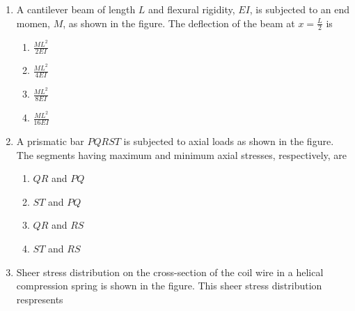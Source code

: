 \documentclass[journal]{IEEEtran}
\numberwithin{equation}{enumi}
\numberwithin{figure}{enumi}
\begin{document}
\begin{enumerate}
	\item A cantilever beam of length $L$ and flexural rigidity, $EI$, is subjected to an end momen, $M$, as shown in the figure. The deflection of the beam at $x = \frac{L}{2}$ is 
		
		\begin{figure}[H]
		\centering
		\resizebox{0.5\textwidth}{!}{}
		\end{figure}

		\hfill{}

		\begin{multicols}{4}
			\begin{enumerate}
				\item $\frac{ML^2}{2EI}$
				\item $\frac{ML^2}{4EI}$
				\item $\frac{ML^2}{8EI}$
				\item $\frac{ML^2}{16EI}$
			\end{enumerate}
		\end{multicols}

	\item A prismatic bar $PQRST$ is subjected to axial loads as shown in the figure. The segments having maximum and minimum axial stresses, respectively, are 

		\begin{figure}[H]  
                \centering
                \resizebox{0.6\textwidth}{!}{}
                \end{figure}

		\hfill{}

		\begin{multicols}{2}
			\begin{enumerate}
				\item $QR$ and $PQ$
				\item $ST$ and $PQ$
				\item $QR$ and $RS$
				\item $ST$ and $RS$
			\end{enumerate}
		\end{multicols}

	\item Sheer stress distribution on the cross-section of the coil wire in a helical compression spring is shown in the figure. This sheer stress distribution respresents
		

\end{enumerate}
\end{document}
